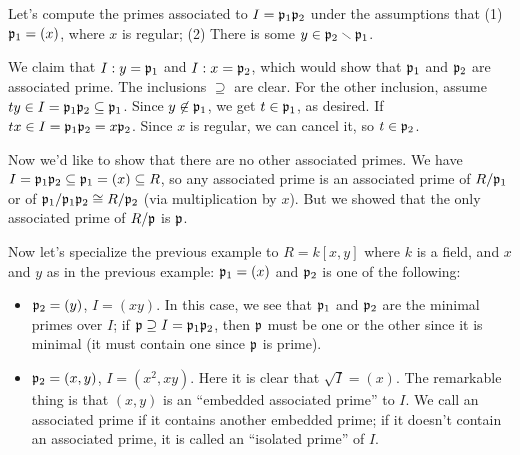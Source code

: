  \setcounter{lecture}{5}

 \begin{example}
   Let's compute the primes associated to $I=\mathfrak{p}_1\mathfrak{p}_2$ under the assumptions that (1)
   $\mathfrak{p}_1=(x)$, where $x$ is regular; (2) There is some $y\in \mathfrak{p}_2\smallsetminus \mathfrak{p}_1$.

   We claim that $I:y=\mathfrak{p}_1$ and $I:x=\mathfrak{p}_2$, which would show that $\mathfrak{p}_1$ and $\mathfrak{p}_2$ are
   associated prime. The inclusions $\supseteq$ are clear. For the other inclusion,
   assume $ty\in I=\mathfrak{p}_1\mathfrak{p}_2\subseteq \mathfrak{p}_1$. Since $y\not\in \mathfrak{p}_1$, we get $t\in \mathfrak{p}_1$, as
   desired. If $tx\in I=\mathfrak{p}_1\mathfrak{p}_2 = x\mathfrak{p}_2$. Since $x$ is regular, we can cancel it, so
   $t\in \mathfrak{p}_2$.

   Now we'd like to show that there are no other associated primes. We have
   $I=\mathfrak{p}_1\mathfrak{p}_2\subseteq \mathfrak{p}_1=(x)\subseteq R$, so any associated prime is an associated
   prime of $R/\mathfrak{p}_1$ or of $\mathfrak{p}_1/\mathfrak{p}_1\mathfrak{p}_2\cong R/\mathfrak{p}_2$ (via multiplication by $x$). But
   we showed that the only associated prime of $R/\mathfrak{p}$ is $\mathfrak{p}$.
 \end{example}
 \begin{example}
   Now let's specialize the previous example to $R=k[x,y]$ where $k$ is a field, and $x$
   and $y$ as in the previous example: $\mathfrak{p}_1=(x)$ and $\mathfrak{p}_2$ is one of the following:
   \begin{itemize}
     \item $\mathfrak{p}_2=(y)$, $I=(xy)$. In this case, we see that $\mathfrak{p}_1$ and $\mathfrak{p}_2$ are the
     minimal primes over $I$; if $\mathfrak{p}\supseteq I=\mathfrak{p}_1\mathfrak{p}_2$, then $\mathfrak{p}$ must be one or the
     other since it is minimal (it must contain one since $\mathfrak{p}$ is prime).

     \item $\mathfrak{p}_2=(x,y)$, $I=(x^2,xy)$. Here it is clear that $\sqrt I=(x)$. The
     remarkable thing is that $(x,y)$ is an ``embedded associated prime'' to $I$. We call
     an associated prime if it contains another embedded prime; if it doesn't contain an
     associated prime, it is called an ``isolated prime'' of $I$.
   \end{itemize}
   \vspace*{-1.5\baselineskip}
 \end{example}

